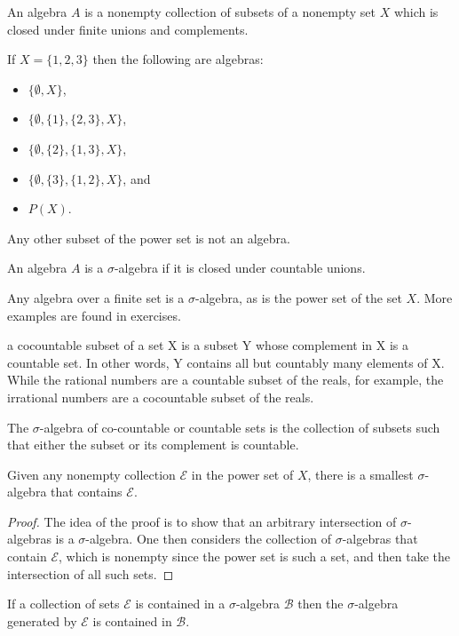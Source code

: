 
\begin{dfn}[algebra] An algebra $A$ is a nonempty collection of subsets of a nonempty set $X$ which is closed under finite unions and complements.
\end{dfn}

\begin{example} If $X = \{ 1, 2, 3 \}$ then the following are algebras:
\begin{itemize}
\item $ \{ \emptyset, X \} $,
\item $ \{ \emptyset, \{ 1 \}, \{ 2, 3 \}, X \}$,
\item $ \{ \emptyset, \{ 2 \}, \{ 1, 3 \}, X \} $,
\item $ \{ \emptyset, \{ 3 \}, \{ 1, 2 \}, X \}$, and 
\item $ P(X)$.
\end{itemize}
Any other subset of the power set is not an algebra.
\end{example}

\begin{dfn}[$\sa$] An algebra $A$ is a $\sigma$-algebra if it is closed under countable unions. \end{dfn}

\begin{example}
Any algebra over a finite set is a $\sigma$-algebra, as is the power set of the set $X$. More examples are found in exercises.
\end{example}
\begin{dfn} a cocountable subset of a set X is a subset Y whose complement in X is a countable set. In other words, Y contains all but countably many elements of X. While the rational numbers are a countable subset of the reals, for example, the irrational numbers are a cocountable subset of the reals.
\end{dfn}

\begin{dfn} The $\sigma$-algebra of co-countable or countable sets is the collection of subsets such that either the subset or its complement is countable.
\end{dfn}

\begin{prop} Given any nonempty collection $ \mathcal{E}$ in the power set of $X$, there is a smallest $\sigma$-algebra that contains $\mathcal{E}$. 
\begin{proof} The idea of the proof is to show that an arbitrary intersection of $\sigma$-algebras is a $\sigma$-algebra.  One then considers the collection of $\sigma$-algebras that contain $ \mathcal{E}$, which is nonempty since the power set is such a set, and then take the intersection of all such sets.
\end{proof}
\end{prop}
\begin{lem} If a collection of sets $\mathcal{E}$ is contained in a $\sigma$-algebra $\mathcal{B}$ then the $\sigma$-algebra generated by $\mathcal{E}$ is contained in $ \mathcal{B}$. \end{lem}

